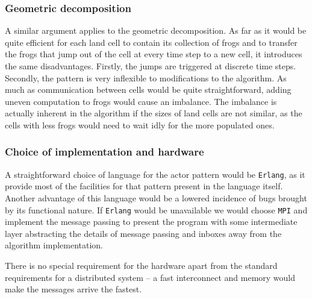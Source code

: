 \documentclass[11pt,a4paper]{article}
\begin{document}
\subsubsection{Geometric decomposition}
A similar argument applies to the geometric decomposition.
As far as it would be quite efficient for each land cell to contain its collection of frogs and to transfer the frogs that jump out of the cell at every time step to a new cell, it introduces the same disadvantages.
Firstly, the jumps are triggered at discrete time steps.
Secondly, the pattern is very inflexible to modifications to the algorithm.
As much as communication between cells would be quite straightforward, adding uneven computation to frogs would cause an imbalance.
The imbalance is actually inherent in the algorithm if the sizes of land cells are not similar, as the cells with less frogs would need to wait idly for the more populated ones.

\subsubsection{Choice of implementation and hardware}
A straightforward choice of language for the actor pattern would be \texttt{Erlang}, as it provide most of the facilities for that pattern present in the language itself.
Another advantage of this language would be a lowered incidence of bugs brought by its functional nature.
If \texttt{Erlang} would be unavailable we would choose \texttt{MPI} and implement the message passing to present the program with some intermediate layer abstracting the details of message passing and inboxes away from the algorithm implementation.

There is no special requirement for the hardware apart from the standard requirements for a distributed system -- a fast interconnect and memory would make the messages arrive the fastest.
\end{document}
